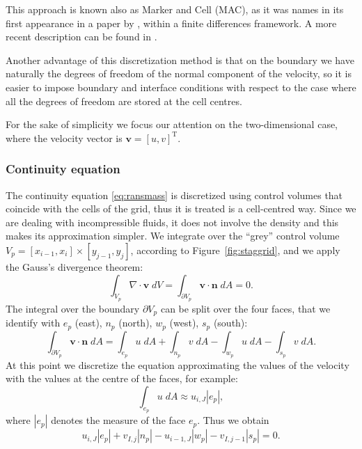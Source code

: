 This approach is known also as Marker and Cell (MAC), as it was names in its 
first appearance in a paper by \textcite{stagg:orig}, within a finite 
differences framework. A more recent description can be found in 
\cite{main:vermal}.

Another advantage of this discretization method is that on the boundary we have naturally 
the degrees of freedom of the normal component of the velocity, so it is easier 
to impose boundary and interface conditions with respect to the case where all the degrees of freedom are stored at the cell centres.

For the sake of simplicity we focus our attention on the two-dimensional case, where the velocity vector is 
$\mathbf{v} = [u, v]^{\mathrm{T}}$.
%
\subsubsection{Continuity equation}
The continuity equation \eqref{eq:ransmass} is discretized using control 
volumes that coincide with the cells of the grid, thus it is treated is a 
cell-centred way. Since we are dealing with incompressible fluids, it does not 
involve the density and this makes its approximation simpler.
We integrate over the ``grey'' control volume $V_p = [x_{i-1},x_i] \times 
[y_{j-1},y_j]$, according to Figure~\ref{fig:staggrid}, and we apply the 
Gauss's divergence theorem:
\begin{equation}
\int_{V_p} \nabla \cdot \mathbf{v} \; dV = \int_{\partial V_p} \mathbf{v} \cdot 
\mathbf{n} \; dA = 0. 
\end{equation}
The integral over the boundary $\partial V_p$ can be split over the four faces, 
that we identify with $e_p$ (east), $n_p$ (north), $w_p$ (west), $s_p$ (south):
\begin{equation}
\int_{\partial V_p} \mathbf{v} \cdot \mathbf{n} \; dA = \int_{e_p} u \; dA
+ \int_{n_p} v \; dA - \int_{w_p} u \; dA - \int_{s_p} v \; dA.
\end{equation}
At this point we discretize the equation approximating the values of the 
velocity with the values at the centre of the faces, for example:
\begin{equation}
\int_{e_p} u \; dA \approx u_{i,J} |e_p|,
\end{equation}
where $|e_p|$ denotes the measure of the face $e_p$. Thus we obtain
\begin{equation}
	u_{i,J} |e_p| + v_{I,j}|n_p| - u_{i-1,J}|w_p| - v_{I,j-1}|s_p| = 0.
\end{equation}
%
